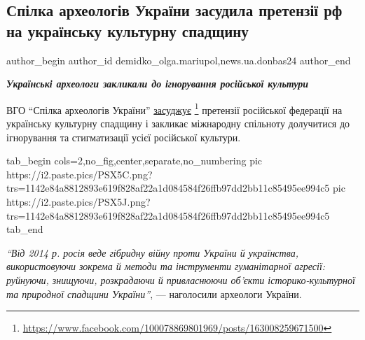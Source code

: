  
 
 
 
 
 
\subsection{Спілка археологів України засудила претензії рф на українську культурну спадщину}
\label{sec:06_10_2022.stz.news.ua.donbas24.1.spilka_arheologiv_ukr_zasudyla_pretenzii_rf}
 
\ifcmt
 author_begin
   author_id demidko_olga.mariupol,news.ua.donbas24
 author_end
\fi


\begin{center}
  \em\bfseries\Large
Українські археологи закликали до ігнорування російської культури
\end{center}

ВГО \enquote{Спілка археологів України} \href{https://www.facebook.com/100078869801969/posts/163008259671500}{засуджує}%
\footnote{\url{https://www.facebook.com/100078869801969/posts/163008259671500}} претензії російської федерації на
українську культурну спадщину і закликає міжнародну спільноту долучитися до
ігнорування та стигматизації усієї російської культури.

\ifcmt
  tab_begin cols=2,no_fig,center,separate,no_numbering
     pic https://i2.paste.pics/PSX5C.png?trs=1142e84a8812893e619f828af22a1d084584f26ffb97dd2bb11c85495ee994c5
		 pic https://i2.paste.pics/PSX5J.png?trs=1142e84a8812893e619f828af22a1d084584f26ffb97dd2bb11c85495ee994c5
  tab_end
\fi

\begin{leftbar}
\emph{\enquote{Від 2014 р. росія веде гібридну війну проти України й українства,
використовуючи зокрема й методи та інструменти гуманітарної агресії: руйнуючи,
знищуючи, розкрадаючи й привласнюючи об'єкти історико-культурної та природної
спадщини України}}, — наголосили археологи України.
\end{leftbar}

